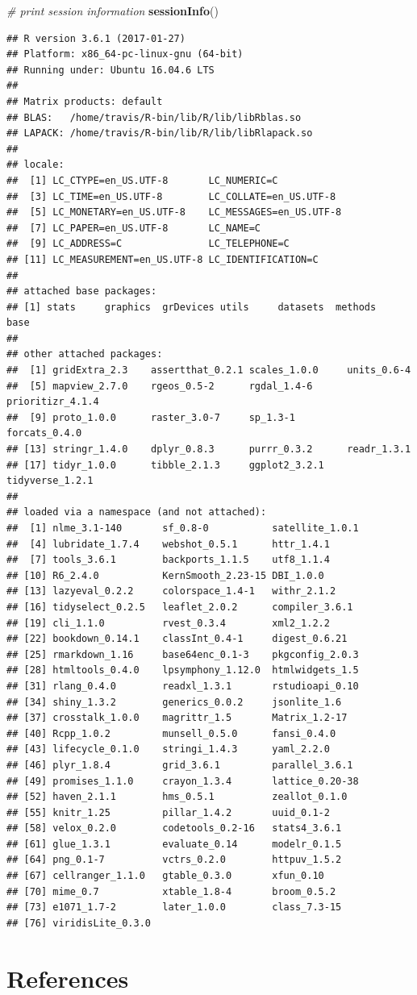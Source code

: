 \documentclass[12pt,]{book}
\newenvironment{Shaded}{\begin{snugshade}}{\end{snugshade}}
\newcommand{\KeywordTok}[1]{\textcolor[rgb]{0.13,0.29,0.53}{\textbf{#1}}}
\newcommand{\CommentTok}[1]{\textcolor[rgb]{0.56,0.35,0.01}{\textit{#1}}}
\newcommand{\NormalTok}[1]{#1}
\begin{document}
\begin{Shaded}
\begin{Highlighting}[]
\CommentTok{# print session information}
\KeywordTok{sessionInfo}\NormalTok{()}
\end{Highlighting}
\end{Shaded}

\begin{verbatim}
## R version 3.6.1 (2017-01-27)
## Platform: x86_64-pc-linux-gnu (64-bit)
## Running under: Ubuntu 16.04.6 LTS
## 
## Matrix products: default
## BLAS:   /home/travis/R-bin/lib/R/lib/libRblas.so
## LAPACK: /home/travis/R-bin/lib/R/lib/libRlapack.so
## 
## locale:
##  [1] LC_CTYPE=en_US.UTF-8       LC_NUMERIC=C              
##  [3] LC_TIME=en_US.UTF-8        LC_COLLATE=en_US.UTF-8    
##  [5] LC_MONETARY=en_US.UTF-8    LC_MESSAGES=en_US.UTF-8   
##  [7] LC_PAPER=en_US.UTF-8       LC_NAME=C                 
##  [9] LC_ADDRESS=C               LC_TELEPHONE=C            
## [11] LC_MEASUREMENT=en_US.UTF-8 LC_IDENTIFICATION=C       
## 
## attached base packages:
## [1] stats     graphics  grDevices utils     datasets  methods   base     
## 
## other attached packages:
##  [1] gridExtra_2.3    assertthat_0.2.1 scales_1.0.0     units_0.6-4     
##  [5] mapview_2.7.0    rgeos_0.5-2      rgdal_1.4-6      prioritizr_4.1.4
##  [9] proto_1.0.0      raster_3.0-7     sp_1.3-1         forcats_0.4.0   
## [13] stringr_1.4.0    dplyr_0.8.3      purrr_0.3.2      readr_1.3.1     
## [17] tidyr_1.0.0      tibble_2.1.3     ggplot2_3.2.1    tidyverse_1.2.1 
## 
## loaded via a namespace (and not attached):
##  [1] nlme_3.1-140       sf_0.8-0           satellite_1.0.1   
##  [4] lubridate_1.7.4    webshot_0.5.1      httr_1.4.1        
##  [7] tools_3.6.1        backports_1.1.5    utf8_1.1.4        
## [10] R6_2.4.0           KernSmooth_2.23-15 DBI_1.0.0         
## [13] lazyeval_0.2.2     colorspace_1.4-1   withr_2.1.2       
## [16] tidyselect_0.2.5   leaflet_2.0.2      compiler_3.6.1    
## [19] cli_1.1.0          rvest_0.3.4        xml2_1.2.2        
## [22] bookdown_0.14.1    classInt_0.4-1     digest_0.6.21     
## [25] rmarkdown_1.16     base64enc_0.1-3    pkgconfig_2.0.3   
## [28] htmltools_0.4.0    lpsymphony_1.12.0  htmlwidgets_1.5   
## [31] rlang_0.4.0        readxl_1.3.1       rstudioapi_0.10   
## [34] shiny_1.3.2        generics_0.0.2     jsonlite_1.6      
## [37] crosstalk_1.0.0    magrittr_1.5       Matrix_1.2-17     
## [40] Rcpp_1.0.2         munsell_0.5.0      fansi_0.4.0       
## [43] lifecycle_0.1.0    stringi_1.4.3      yaml_2.2.0        
## [46] plyr_1.8.4         grid_3.6.1         parallel_3.6.1    
## [49] promises_1.1.0     crayon_1.3.4       lattice_0.20-38   
## [52] haven_2.1.1        hms_0.5.1          zeallot_0.1.0     
## [55] knitr_1.25         pillar_1.4.2       uuid_0.1-2        
## [58] velox_0.2.0        codetools_0.2-16   stats4_3.6.1      
## [61] glue_1.3.1         evaluate_0.14      modelr_0.1.5      
## [64] png_0.1-7          vctrs_0.2.0        httpuv_1.5.2      
## [67] cellranger_1.1.0   gtable_0.3.0       xfun_0.10         
## [70] mime_0.7           xtable_1.8-4       broom_0.5.2       
## [73] e1071_1.7-2        later_1.0.0        class_7.3-15      
## [76] viridisLite_0.3.0
\end{verbatim}

\chapter{References}\label{references}


\end{document}
